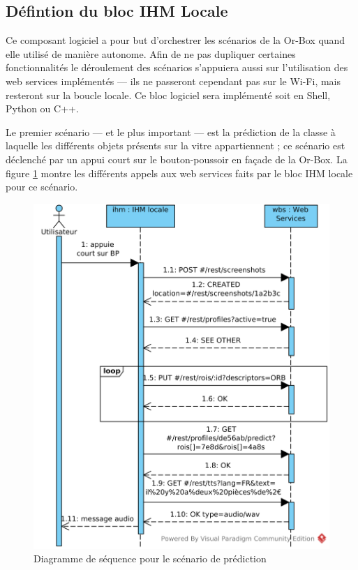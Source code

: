 \subsection{Défintion du bloc IHM Locale}
\label{sub:DefIHM}

Ce composant logiciel a pour but d'orchestrer les scénarios de la Or-Box quand elle utilisé de manière autonome.
Afin de ne pas dupliquer certaines fonctionnalités le déroulement des scénarios s'appuiera aussi sur l'utilisation des web services implémentés --- ils ne passeront cependant pas sur le Wi-Fi, mais resteront sur la boucle locale.
Ce bloc logiciel sera implémenté soit en Shell, Python ou C++.

Le premier scénario --- et le plus important --- est la prédiction de la classe à laquelle les différents objets présents sur la vitre appartiennent ; ce scénario est déclenché par un appui court sur le bouton-poussoir en façade de la Or-Box.
La figure \ref{predictSD} montre les différents appels aux web services faits par le bloc IHM locale pour ce scénario.

\begin{figure}[H]
    \centering
    \includegraphics[scale=0.75]{img/SysML_Predict_SD.png}
    \caption{Diagramme de séquence pour le scénario de prédiction}
    \label{predictSD}
\end{figure}

